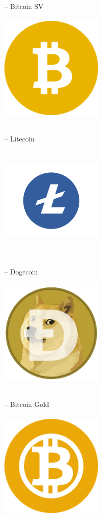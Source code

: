 \documentclass[ngerman]{scrreprt}
\begin{document}
\begin{itemize}
\begin{itemize}
		\item [--] {Bitcoin SV} \\ \\
		\includegraphics[width=5cm,height=5cm]{bitcoinsv.png}\\ \\
		\item [--] {Litecoin} \\ \\ 
		\includegraphics[width=5cm,height=5cm]{litecoin.jpg} \\ \\
		\item [--] {Dogecoin} \\ \\
		\includegraphics[width=5cm,height=5cm]{dogecoin.png}\\ \\
		\item [--] {Bitcoin Gold}\\ \\
		\includegraphics[width=5cm,height=5cm]{bitcoingold.png}\\ \\




\end{itemize}
\end{itemize}
\end{document}
